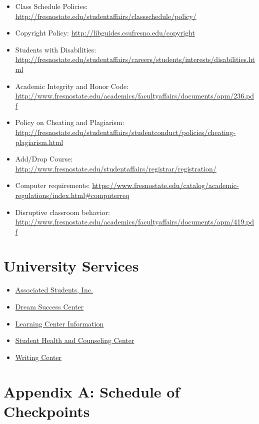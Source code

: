 \begin{itemize}
\tightlist
\item
  Class Schedule Policies:
  \url{http://fresnostate.edu/studentaffairs/classschedule/policy/}
\item
  Copyright Policy: \url{http://libguides.csufresno.edu/copyright}
\item
  Students with Disabilities:
  \url{http://fresnostate.edu/studentaffairs/careers/students/interests/disabilities.html}
\item
  Academic Integrity and Honor Code:
  \url{http://www.fresnostate.edu/academics/facultyaffairs/documents/apm/236.pdf}
\item
  Policy on Cheating and Plagiarism:
  \url{http://fresnostate.edu/studentaffairs/studentconduct/policies/cheating-plagiarism.html}
\item
  Add/Drop Course:
  \url{http://www.fresnostate.edu/studentaffairs/registrar/registration/}
\item
  Computer requirements:
  \url{https://www.fresnostate.edu/catalog/academic-regulations/index.html\#computerreq}
\item
  Disruptive classroom behavior:
  \url{http://www.fresnostate.edu/academics/facultyaffairs/documents/apm/419.pdf}
\end{itemize}

\hypertarget{university-services}{%
\section{University Services}\label{university-services}}

\begin{itemize}
\tightlist
\item
  \href{http://fresnostateasi.org/}{Associated Students, Inc.}
\item
  \href{http://fresnostate.edu/studentaffairs/dsc/index.html}{Dream
  Success Center}
\item
  \href{http://fresnostate.edu/studentaffairs/lrc}{Learning Center
  Information}
\item
  \href{https://www.fresnostate.edu/studentaffairs/health/}{Student
  Health and Counseling Center}
\item
  \href{http://www.fresnostate.edu/artshum/writingcenter/}{Writing
  Center}
\end{itemize}

\newpage

\hypertarget{checkpoint-schedule}{%
\section{Appendix A: Schedule of
Checkpoints}\label{checkpoint-schedule}}

